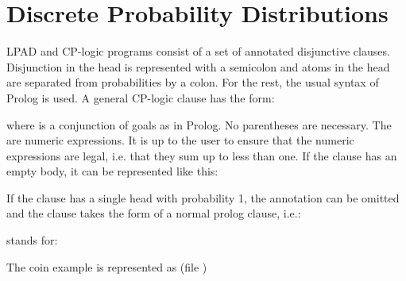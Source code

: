 \documentclass[letterpaper,10pt,english]{sphinxmanual}
\begin{document}
\section{Discrete Probability Distributions}
\label{\detokenize{index:discrete-probability-distributions}}
LPAD and CP-logic programs consist of a set of annotated disjunctive clauses.
Disjunction in the head is represented with a semicolon and atoms in the head are separated from probabilities by a colon.
For the rest, the usual syntax of Prolog is used.
A general CP-logic clause has the form:

\begin{sphinxVerbatim}[commandchars=\\\{\}]
      
\end{sphinxVerbatim}

where  is a conjunction of goals as in Prolog.
No parentheses are necessary.
The  are numeric expressions.
It is up to the user to ensure that the numeric expressions are legal, i.e. that they sum up to less than one.
If the clause has an empty body, it can be represented like this:

\begin{sphinxVerbatim}[commandchars=\\\{\}]
    
\end{sphinxVerbatim}

If the clause has a single head with probability 1, the annotation can be omitted and the clause takes
the form of a normal prolog clause, i.e.:

\begin{sphinxVerbatim}[commandchars=\\\{\}]
  
\end{sphinxVerbatim}

stands for:

\begin{sphinxVerbatim}[commandchars=\\\{\}]
  
\end{sphinxVerbatim}

The coin example  is represented as (file )
\end{document}
